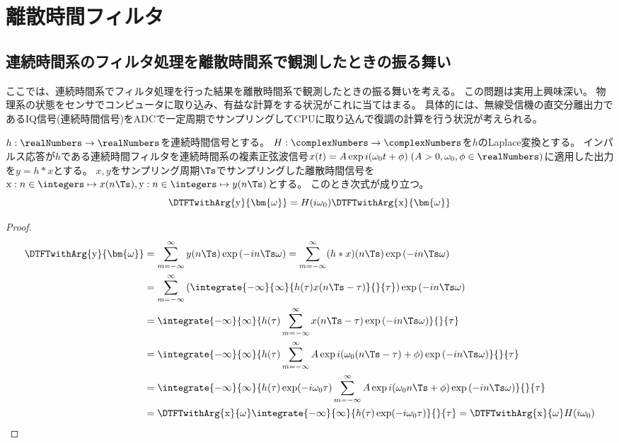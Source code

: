 \chapter{離散時間フィルタ}
    \section{連続時間系のフィルタ処理を離散時間系で観測したときの振る舞い}
        ここでは、連続時間系でフィルタ処理を行った結果を離散時間系で観測したときの振る舞いを考える。
        この問題は実用上興味深い。
        物理系の状態をセンサでコンピュータに取り込み、有益な計算をする状況がこれに当てはまる。
        具体的には、無線受信機の直交分離出力であるIQ信号(連続時間信号)をADCで一定周期でサンプリングしてCPUに取り込んで復調の計算を行う状況が考えられる。
        \begin{shadebox}
            $h:\realNumbers\to\realNumbers$を連続時間信号とする。
            $H:\complexNumbers\to\complexNumbers$を$h$のLaplace変換とする。
            インパルス応答が$h$である連続時間フィルタを連続時間系の複素正弦波信号$x(t) = A\exp i(\omega_0 t + \phi)\;(A>0,\omega_0,\phi\in\realNumbers)$に適用した出力を$y=h*x$とする。
            $x,y$をサンプリング周期$\Ts$でサンプリングした離散時間信号を$\mathrm{x}: n\in\integers\mapsto x(n\Ts), \mathrm{y}: n\in\integers\mapsto y(n\Ts)$とする。
            このとき次式が成り立つ。
            \[ \DTFTwithArg{\mathrm{y}}{\bm{\omega}} = H(i\omega_0)\DTFTwithArg{\mathrm{x}}{\bm{\omega}} \]
        \end{shadebox}
        \begin{proof}
            \begin{align*}
                \DTFTwithArg{\mathrm{y}}{\bm{\omega}} &= \sum_{m=-\infty}^\infty y(n\Ts)\exp \left(-i n\Ts\omega\right) = \sum_{m=-\infty}^\infty (h*x)(n\Ts)\exp \left(-i n\Ts\omega\right) \\
                &= \sum_{m=-\infty}^\infty \left(\integrate{-\infty}{\infty}{h(\tau)x(n\Ts-\tau)}{}{\tau}\right)\exp \left(-i n\Ts\omega\right) \\
                &= \integrate{-\infty}{\infty}{h(\tau)\sum_{m=-\infty}^\infty x(n\Ts-\tau)\exp \left(-i n\Ts\omega\right)}{}{\tau} \\
                &= \integrate{-\infty}{\infty}{h(\tau)\sum_{m=-\infty}^\infty A\exp i(\omega_0 (n\Ts-\tau) + \phi)\exp \left(-i n\Ts\omega\right)}{}{\tau} \\
                &= \integrate{-\infty}{\infty}{h(\tau) \exp(-i\omega_0\tau)\sum_{m=-\infty}^\infty A\exp i(\omega_0 n\Ts + \phi)\exp \left(-i n\Ts\omega\right)}{}{\tau} \\
                &= \DTFTwithArg{\mathrm{x}}{\omega} \integrate{-\infty}{\infty}{h(\tau) \exp(-i\omega_0\tau)}{}{\tau} = \DTFTwithArg{\mathrm{x}}{\omega}H(i\omega_0)
            \end{align*}
        \end{proof}
